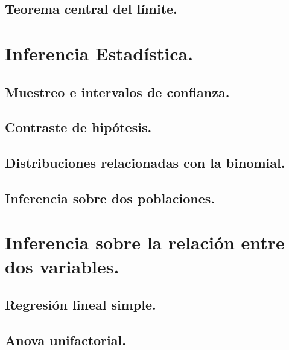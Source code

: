 \documentclass[10pt,a4paper]{book}
\begin{document}
\chapter{Teorema central del límite.}
\label{cap:TeoremaCentralLimite}



\part{Inferencia Estadística.}
\label{parte:InferenciaEstadistica}


\chapter{Muestreo e intervalos de confianza.}
\label{cap:IntervalosConfianza}


\chapter{Contraste de hipótesis.}
\label{cap:ContrasteHipotesis}



\chapter{Distribuciones relacionadas con la binomial.}
\label{cap:DistribucionesRelacionadasBinomial}


\chapter{Inferencia sobre dos poblaciones.}
\label{cap:Inferencia2Poblaciones}


\part{Inferencia sobre la relación entre dos variables.}
\label{parte:InferenciaRelacion2Variables}


\chapter{Regresión lineal simple.}
\label{cap:RegresionLinealSimple}


\chapter{Anova unifactorial.}
\label{cap:IntroduccionAnova}

\end{document}
